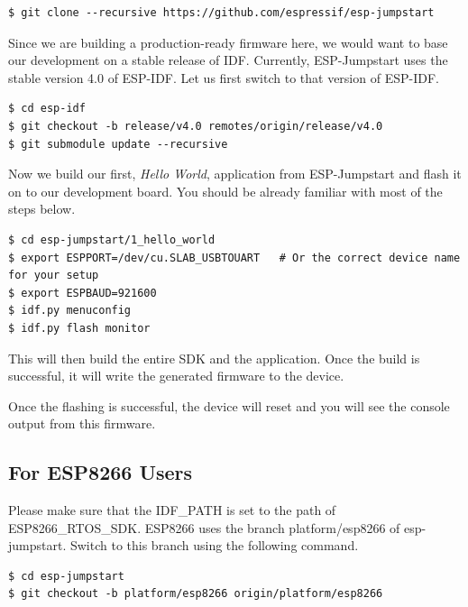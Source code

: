 \documentclass[main.tex]{subfiles}
\begin{document}
\begin{verbatim}
$ git clone --recursive https://github.com/espressif/esp-jumpstart
\end{verbatim}

Since we are building a production-ready firmware here, we would want to base our development on a stable release of IDF. Currently, ESP-Jumpstart uses the stable version 4.0 of ESP-IDF. Let us first switch to that version of ESP-IDF.
\begin{verbatim}
$ cd esp-idf
$ git checkout -b release/v4.0 remotes/origin/release/v4.0
$ git submodule update --recursive
\end{verbatim}

Now we build our first, \textit{Hello World}, application from ESP-Jumpstart and flash it on to our development board. You should be already familiar with most of the steps below.

\begin{verbatim}
$ cd esp-jumpstart/1_hello_world
$ export ESPPORT=/dev/cu.SLAB_USBTOUART   # Or the correct device name for your setup
$ export ESPBAUD=921600
$ idf.py menuconfig
$ idf.py flash monitor
\end{verbatim}

This will then build the entire SDK and the application. Once the build is successful, it will write the generated firmware to the device.


Once the flashing is successful, the device will reset and you will see the console output from this firmware.

\subsection{For ESP8266 Users}\label{sec:for_esp8266_users}
Please make sure that the IDF\_PATH is set to the path of ESP8266\_RTOS\_SDK. ESP8266 uses the branch platform/esp8266 of esp-jumpstart. Switch to this branch using the following command.

\begin{verbatim}
$ cd esp-jumpstart
$ git checkout -b platform/esp8266 origin/platform/esp8266
\end{verbatim}
\end{document}
